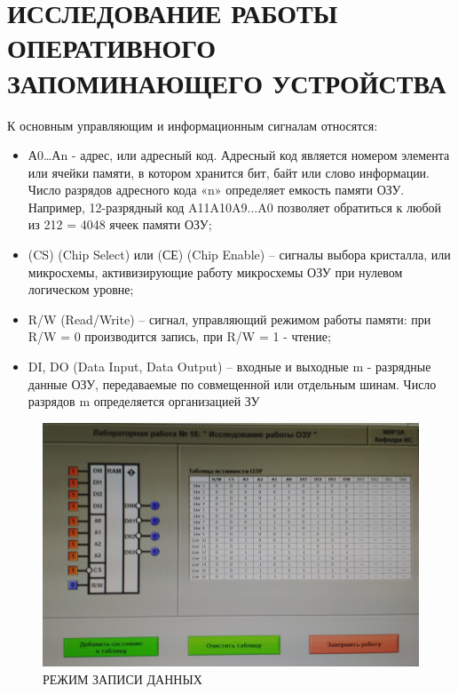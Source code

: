 \section{ИССЛЕДОВАНИЕ РАБОТЫ ОПЕРАТИВНОГО ЗАПОМИНАЮЩЕГО УСТРОЙСТВА}

К основным управляющим и информационным сигналам относятся:
\begin{itemize}
	
\item А0…Аn - адрес, или адресный код. Адресный код является номером элемента или ячейки памяти, в котором хранится бит, байт или слово информации. Число разрядов адресного кода «n» определяет емкость памяти ОЗУ. Например, 12-разрядный код A11A10A9...A0 позволяет обратиться к любой из 212 = 4048 ячеек памяти ОЗУ;

\item (CS) (Chip Select) или (СЕ) (Chip Enable) – сигналы выбора кристалла, или микросхемы, активизирующие работу микросхемы ОЗУ при
нулевом логическом уровне;

\item R/W (Read/Write) – сигнал, управляющий режимом работы памяти: при R/W = 0 производится запись, при R/W = 1 - чтение;

\item DI, DO (Data Input, Data Output) – входные и выходные m - разрядные данные ОЗУ, передаваемые по совмещенной или отдельным шинам. Число разрядов m определяется организацией ЗУ

\end{itemize}

\begin{figure}[H]
	\centering
	\includegraphics[width=0.95\linewidth]{imgs/16/1}
	\caption{РЕЖИМ ЗАПИСИ ДАННЫХ}
	\label{fig:16_1}
\end{figure}

